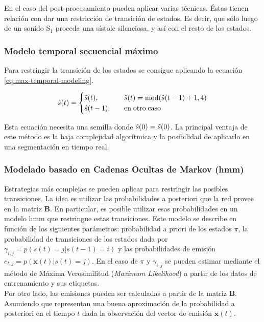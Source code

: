 \indent En el caso del post-procesamiento pueden aplicar varias técnicas. Éstas tienen relación con dar una restricción de transición de estados. Es decir, que sólo luego de un sonido S$_1$ proceda una sístole silenciosa, y así con el resto de los estados.

\subsubsection*{Modelo temporal secuencial máximo}

\indent Para restringir la transición de los estados se consigue aplicando la ecuación \ref{eq:max-temporal-modeling}.

\begin{align} \label{eq:max-temporal-modeling}
\hat{s}(t) =
\begin{cases}
  \Tilde{s}(t), \quad &\Tilde{s}(t) = \mathrm{mod}(\hat{s}(t-1)+1, 4)\\
  \hat{s}(t-1), \quad &\mathrm{en\;otro\;caso}
\end{cases}
\end{align}

\indent Esta ecuación necesita una semilla donde $\hat{s}(0) = \Tilde{s}(0)$. La principal ventaja de este método es la baja complejidad algorítmica y la posibilidad de aplicarlo en una segmentación en tiempo real.

\subsubsection*{Modelado basado en Cadenas Ocultas de Markov (\acrshort{hmm})}

\indent Estrategias más complejas se pueden aplicar para restringir las posibles transiciones. La idea es utilizar las probabilidades a posteriori que la red provee en la matriz $\mathbf{B}$. En particular, es posible utilizar esas probabilidades en un modelo \acrshort{hmm} que restringue estas transiciones. Este modelo se describe en función de los siguientes parámetros: probabilidad a priori de los estados $\pi$, la probabilidad de transiciones de los estados dada por $\gamma_{i,j} = p(s(t)=j|s(t-1)=i)$ y las probabilidades de emisión $e_{t,j} = p(\mathbf{x}(t)|s(t) = j)$. En el caso de $\pi$ y $\gamma_{i,j}$ se pueden estimar mediante el método de Máxima Verosimilitud (\textit{Maximum Likelihood}) a partir de los datos de entrenamiento y sus etiquetas. \\
\indent Por otro lado, las emisiones pueden ser calculadas a partir de la matriz $\mathbf{B}$. Asumiendo que representan una buena aproximación de la probabilidad a posteriori en el tiempo $t$ dada la observación del vector de emisión $\mathbf{x}(t)$.

